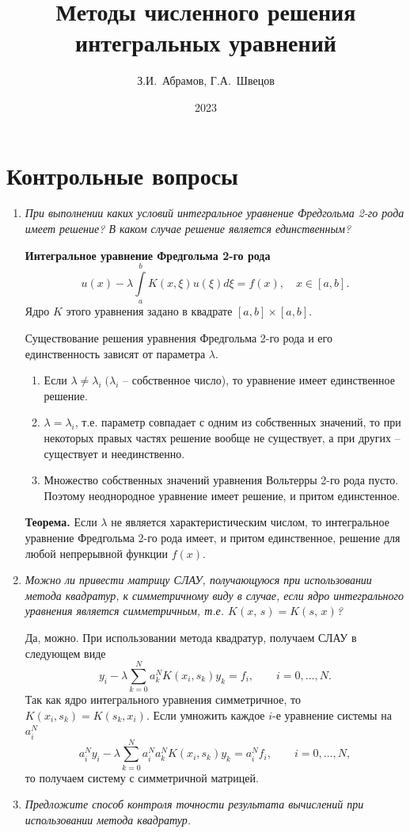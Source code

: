 \documentclass[12pt, a4paper]{article}
\title{Методы численного решения\\ интегральных уравнений}
\author{З.И.~Абрамов, Г.А.~Швецов}
\date{2023}
\begin{document}
	\newcommand{\pl}{\partial}
	\maketitle
	
	\tableofcontents
	
	\newpage
	
	\section{Контрольные вопросы}
	\begin{enumerate}
		\item \textit{При выполнении каких условий интегральное уравнение Фредгольма 2-го рода имеет решение? В каком случае решение является единственным?}
		\smallskip
		
		\textbf{Интегральное уравнение Фредгольма 2-го рода}
		\[
		u(x)-\lambda\int\limits_a^bK(x,\xi)u(\xi)d\xi=f(x),\quad x\in[a,b].
		\]
		Ядро $K$ этого уравнения задано в квадрате $[a,b]\times[a,b]$.
		
		Существование решения уравнения Фредгольма 2-го рода и его единственность зависят от параметра  $\lambda$.
		\begin{enumerate}	
			\item Если $\lambda\ne\lambda_i\;(\lambda_i$ -- собственное число), то уравнение имеет единственное решение.
			\item $\lambda=\lambda_i$, т.е. параметр совпадает с одним из собственных значений, то при некоторых правых частях решение вообще не существует, а при других -- существует и неединственно.
			\item Множество собственных значений уравнения Вольтерры 2-го рода пусто. Поэтому неоднородное уравнение имеет решение, и притом единстенное.
		\end{enumerate}
		
		\textbf{Теорема.} Если $\lambda$ не является характеристическим числом, то интегральное уравнение Фредгольма 2-го рода имеет, и притом единственное, решение для любой непрерывной функции $f(x)$.
		\item \textit{Можно ли привести матрицу СЛАУ, получающуюся при использовании метода квадратур, к симметричному виду в случае, если ядро интегрального уравнения является симметричным, т.е. $K(x,\,s)=K(s,\,x)$?}
		\smallskip
		
		Да, можно. При использовании метода квадратур, получаем СЛАУ в следующем виде
		\[
		y_i-\lambda\sum_{k=0}^Na_k^N
		K(x_i,s_k)y_k=f_i, \qquad i=0,\dots,N.			
		\]
		Так как ядро интегрального уравнения симметричное, то $K(x_i,s_k)=K(s_k,x_i).$ Если умножить каждое $i$-е уравнение системы на $a_i^N$
		\[
		a_i^Ny_i-\lambda\sum_{k=0}^Na_i^Na_k^N
		K(x_i,s_k)y_k=a_i^Nf_i, \qquad i=0,\dots,N,			
		\]
		то получаем систему с симметричной матрицей.
		\item \textit{Предложите способ контроля точности результата вычислений при использовании метода квадратур.}
		\smallskip
		

\end{enumerate}
\end{document}
